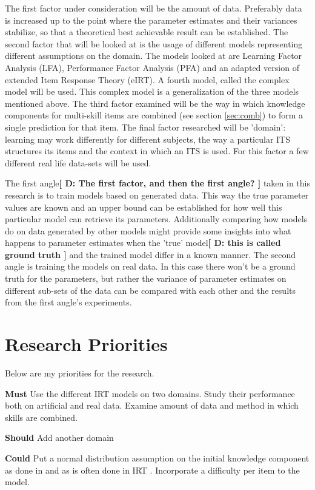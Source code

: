 \documentclass{scrartcl}
\providecommand{\comm}[1]{{\bf[ #1 ]}}
\providecommand{\commd}[1]{\comm{D: {#1}}}
\begin{document}
The first factor under consideration will be the amount of data. Preferably data is increased up to the point where the parameter estimates and their variances stabilize, so that a theoretical best achievable result can be established. The second factor that will be looked at is the usage of different models representing different assumptions on the domain. The models looked at are Learning Factor Analysis (LFA), Performance Factor Analysis (PFA) and an adapted version of extended Item Response Theory (eIRT). A fourth model, called the complex model will be used. This complex model is a generalization of the three models mentioned above. The third factor examined will be the way in which knowledge components for multi-skill items are combined (see section \ref{sec:comb}) to form a single prediction for that item. The final factor researched will be 'domain': learning may work differently for different subjects, the way a particular ITS structures its items and the context in which an ITS is used. For this factor a few different real life data-sets will be used.

The first angle\commd{The first factor, and then the first angle?} taken in this research is to train models based on generated data. This way the true parameter values are known and an upper bound can be established for how well this particular model can retrieve its parameters. Additionally comparing how models do on data generated by other models might provide some insights into what happens to parameter estimates when the 'true' model\commd{this is called ground truth} and the trained model differ in a known manner. The second angle is training the models on real data. In this case there won't be a ground truth for the parameters, but rather the variance of parameter estimates on different sub-sets of the data can be compared with each other and the results from the first angle's experiments.


\section{Research Priorities}
Below are my priorities for the research.

{\bf Must} Use the different IRT models on two domains. Study their performance both on artificial and real data. Examine amount of data and method in which skills are combined.

{\bf Should} Add another domain

{\bf Could} Put a normal distribution assumption on the initial knowledge component as done in \cite{blackart} and as is often done in IRT \cite{irtest}. Incorporate a difficulty per item to the model.
\end{document}
